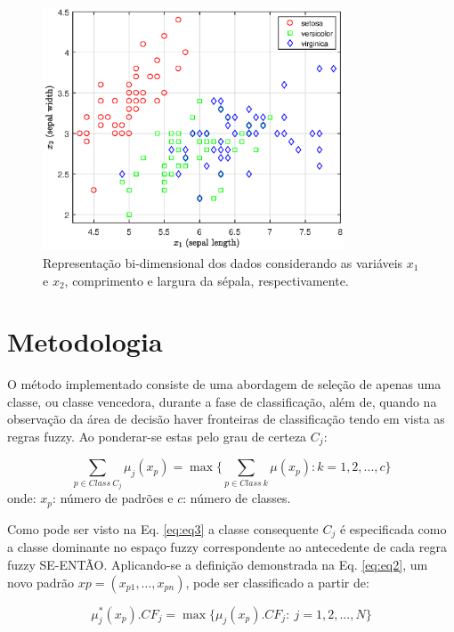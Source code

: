 \documentclass[12pt,a4paper]{article}
\numberwithin{equation}{section}
\begin{document}
\begin{figure}[ht]
\centering
\includegraphics[width=0.8\textwidth]{figures/data.eps}
\caption{Representação bi-dimensional dos dados considerando as variáveis $x_1$ e $x_2$, comprimento e largura da sépala, respectivamente.}
\label{fig:data}
\end{figure}

\section{Metodologia}

O método implementado consiste de uma abordagem de seleção de apenas uma classe, ou classe vencedora, durante a fase de classificação, além de, quando na observação da área de decisão haver fronteiras de classificação tendo em vista as regras fuzzy. Ao ponderar-se estas pelo grau de certeza $C_{j}$:

\begin{equation} \label{eq:eq3}
\sum_{p\in Class~C_{j}} \mu_{j}(x_p)=\max\lbrace\sum_{p\in Class~k}\mu(x_{p}):k=1,2,...,c\rbrace
\end{equation}
onde: $x_{p}$: número de padrões e $c$: número de classes.

Como pode ser visto na Eq. \eqref{eq:eq3} a classe consequente $C_{j}$ é especificada como a classe dominante no espaço fuzzy correspondente ao antecedente de cada regra fuzzy SE-ENTÃO. Aplicando-se a definição demonstrada na Eq. \eqref{eq:eq2}, um novo padrão $x{p}=(x_{p1},...,x_{pn})$, pode ser classificado a partir de:

\begin{equation} \label{eq:eq4}
\mu_{j}^{ *}(x_{p}).CF_{j}=\max\lbrace\mu_{j}(x_{p}).CF_{j}:~j=1,2,...,N\rbrace
\end{equation}
\end{document}
